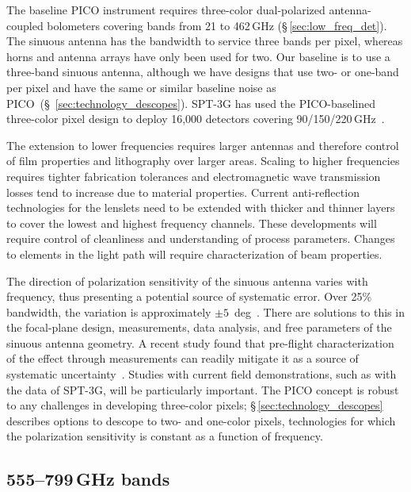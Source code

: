 The baseline PICO instrument requires three-color dual-polarized antenna-coupled bolometers covering bands from 21 to 462\,GHz (\S\,\ref{sec:low_freq_det}).  The sinuous antenna has the bandwidth to service three bands per pixel, whereas horns and antenna arrays have only been used for two. Our baseline is to use a three-band sinuous antenna, although we have designs that use two- or one-band per pixel and have the same or similar baseline noise as PICO~(\S~\ref{sec:technology_descopes}). SPT-3G has used the PICO-baselined three-color pixel design to deploy 16,000 detectors covering 90/150/220\,GHz~\citep{Dutcher2018}.


The extension to lower frequencies requires larger antennas and therefore control of film properties and lithography over larger areas. Scaling to higher frequencies requires tighter fabrication tolerances and electromagnetic wave transmission losses tend to increase due to material properties. Current anti-reflection technologies for the lenslets need to be extended with thicker and thinner layers to cover the lowest and highest frequency channels. These developments will require control of cleanliness and understanding of process parameters. Changes to elements in the light path will require characterization of beam properties.



The direction of polarization sensitivity of the sinuous antenna varies with frequency, thus presenting a potential source of systematic error. Over 25\% bandwidth, the variation is approximately $\pm 5$~deg~\citep{obrient2008b}. There are solutions to this in the focal-plane design, measurements, data analysis, and free parameters of the sinuous antenna geometry.  A recent study found that pre-flight characterization of the effect through measurements can readily mitigate it as a source of systematic uncertainty~\citep{picoweb_wobble}. Studies with current field demonstrations, such as with the data of SPT-3G, will be particularly important. The PICO concept is robust to any challenges in developing three-color pixels; \S\,\ref{sec:technology_descopes} describes options to descope to two- and one-color pixels, technologies for which the polarization sensitivity is constant as a function of frequency.

\subsection{555--799\,GHz bands}
\label{sec:dev_arrays}

